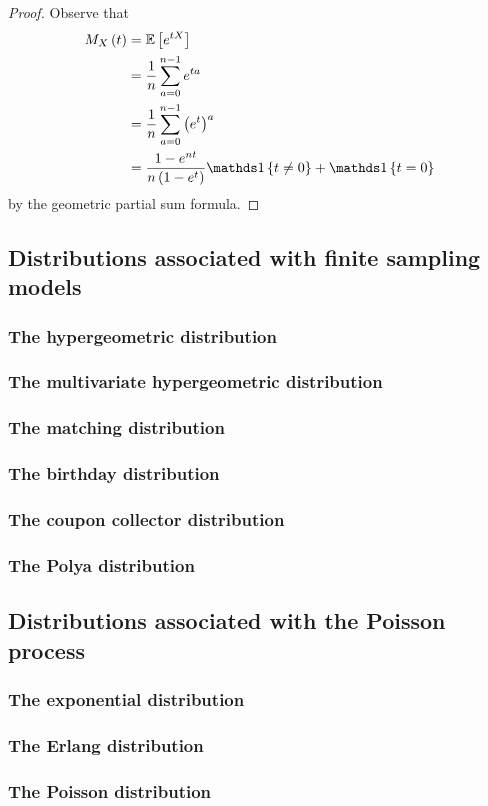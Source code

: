 \begin{proof}
Observe that
\begin{align*}
M_{X}\left(t\right) & =\E\left[e^{tX}\right]\\
 & =\frac{1}{n}\sum_{a=0}^{n-1}e^{ta}\\
 & =\frac{1}{n}\sum_{a=0}^{n-1}\left(e^{t}\right)^{a}\\
 & =\frac{1-e^{nt}}{n\left(1-e^{t}\right)}\indicate\left\{ t\neq0\right\} +\indicate\left\{ t=0\right\} 
\end{align*}
by the geometric partial sum formula.
\end{proof}

\subsection{Distributions associated with finite sampling models}

\subsubsection{The hypergeometric distribution}

\subsubsection{The multivariate hypergeometric distribution}

\subsubsection{The matching distribution}

\subsubsection{The birthday distribution}

\subsubsection{The coupon collector distribution}

\subsubsection{The Polya distribution}

\subsection{Distributions associated with the Poisson process}

\subsubsection{The exponential distribution}

\subsubsection{The Erlang distribution}

\subsubsection{The Poisson distribution}

